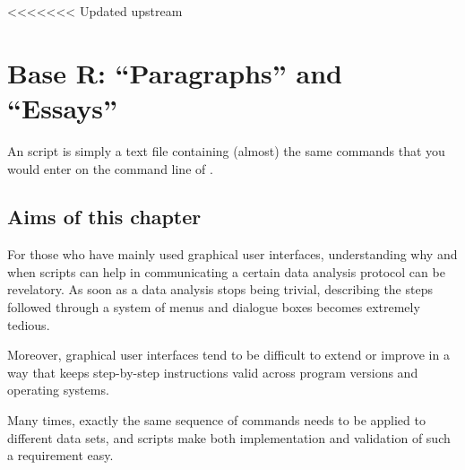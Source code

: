 <<<<<<< Updated upstream

\begin{knitrout}
\color{fgcolor}\begin{kframe}


{\ttfamily\noindent{}}

{\ttfamily\noindent\bfseries{}}\end{kframe}
\end{knitrout}

\chapter{Base R: ``Paragraphs'' and ``Essays''}\label{chap:R:scripts}

\begin{VF}
An \Rlang script is simply a text file containing (almost) the same commands that you would enter on the command line of \Rlang.

\nocite{LemonND}
\end{VF}


\section{Aims of this chapter}

For those who have mainly used graphical user interfaces, understanding why and when scripts can help in communicating a certain data analysis protocol can be revelatory. As soon as a data analysis stops being trivial, describing the steps followed through a system of menus and dialogue boxes becomes extremely tedious.

Moreover, graphical user interfaces tend to be difficult to extend or improve in a way that keeps step-by-step instructions valid across program versions and operating systems.

Many times, exactly the same sequence of commands needs to be applied to different data sets, and scripts make both implementation and validation of such a requirement easy.

